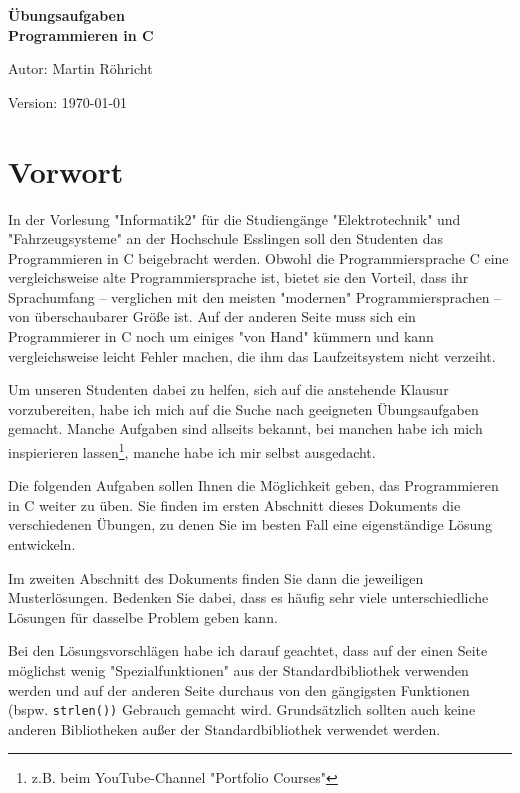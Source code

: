 \documentclass{coding-exercises}
\begin{document}
\begin{titlepage}
  \centering

  {\fontsize{40}{48}\bfseries\lato Übungsaufgaben\\Programmieren in C\par}

  {\Large Autor: Martin Röhricht}

  \vfill
  Version: \today
\end{titlepage}


\frontmatter
\chapter{Vorwort}

In der Vorlesung "Informatik2" für die Studiengänge "Elektrotechnik" und
"Fahrzeugsysteme" an der Hochschule Esslingen soll den Studenten das
Programmieren in C beigebracht werden. Obwohl die Programmiersprache C eine
vergleichsweise alte Programmiersprache ist, bietet sie den Vorteil, dass ihr
Sprachumfang -- verglichen mit den meisten "modernen" Programmiersprachen --
von überschaubarer Größe ist. Auf der anderen Seite muss sich ein Programmierer
in C noch um einiges "von Hand" kümmern und kann vergleichsweise leicht Fehler
machen, die ihm das Laufzeitsystem nicht verzeiht.

Um unseren Studenten dabei zu helfen, sich auf die anstehende Klausur
vorzubereiten, habe ich mich auf die Suche nach geeigneten Übungsaufgaben
gemacht. Manche Aufgaben sind allseits bekannt, bei manchen habe ich mich
inspierieren lassen\footnote{z.B. beim YouTube-Channel "Portfolio Courses"},
manche habe ich mir selbst ausgedacht.

Die folgenden Aufgaben sollen Ihnen die Möglichkeit geben, das Programmieren in
C weiter zu üben. Sie finden im ersten Abschnitt dieses Dokuments die
verschiedenen Übungen, zu denen Sie im besten Fall eine eigenständige Lösung
entwickeln.

Im zweiten Abschnitt des Dokuments finden Sie dann die jeweiligen
Musterlösungen. Bedenken Sie dabei, dass es häufig sehr viele unterschiedliche
Lösungen für dasselbe Problem geben kann.

Bei den Lösungsvorschlägen habe ich darauf geachtet, dass auf der einen Seite
möglichst wenig "Spezialfunktionen" aus der Standardbibliothek verwenden werden
und auf der anderen Seite durchaus von den gängigsten Funktionen (bspw.
\texttt{strlen())} Gebrauch gemacht wird. Grundsätzlich sollten auch
keine anderen Bibliotheken außer der Standardbibliothek verwendet werden.
\end{document}
